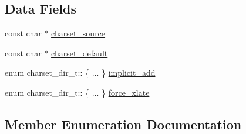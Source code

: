 \subsection*{Data Fields}
\begin{DoxyCompactItemize}
\item 
const char $\ast$ \hyperlink{structcharset__dir__t_a54e5aee3200a70fdaa499b8ed78e6213}{charset\+\_\+source}
\item 
const char $\ast$ \hyperlink{structcharset__dir__t_ad92d0621427301c4372da7c9a22900db}{charset\+\_\+default}
\item 
enum charset\+\_\+dir\+\_\+t\+:: \{ ... \}  \hyperlink{structcharset__dir__t_a3cfdcc0e2650378de597a70f2a77a5dc}{implicit\+\_\+add}
\item 
enum charset\+\_\+dir\+\_\+t\+:: \{ ... \}  \hyperlink{structcharset__dir__t_aa02f3a05d101bf1c9ed08e2e5eb36f3a}{force\+\_\+xlate}
\end{DoxyCompactItemize}


\subsection{Member Enumeration Documentation}
